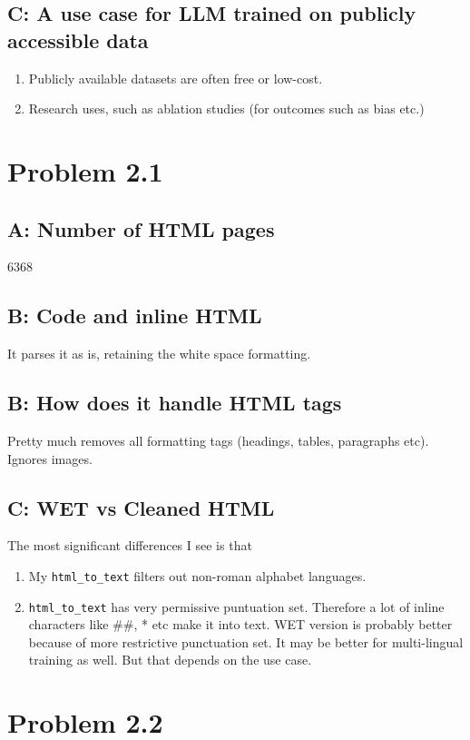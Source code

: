 \documentclass[11pt]{article}
\begin{document}
\subsection{C: A use case for LLM trained on publicly accessible data}
\label{sec:org265351b}
\begin{enumerate}
\item Publicly available datasets are often free or low-cost.
\item Research uses, such as ablation studies (for outcomes such as bias etc.)
\end{enumerate}
\section{Problem 2.1}
\label{sec:org1d44219}
\subsection{A: Number of HTML pages}
\label{sec:orgae95108}
6368
\subsection{B: Code and inline HTML}
\label{sec:org33985d5}
It parses it as is, retaining the white space formatting.
\subsection{B: How does it handle HTML tags}
\label{sec:orgdfa65bc}
Pretty much removes all formatting tags (headings, tables, paragraphs etc). Ignores images. 
\subsection{C: WET vs Cleaned HTML}
\label{sec:orgc227387}
The most significant differences I see is that
\begin{enumerate}
\item My \texttt{html\_to\_text} filters out non-roman alphabet languages.
\item \texttt{html\_to\_text} has very permissive puntuation set. Therefore a lot of inline characters like \#\#, * etc make it into text.
WET version is probably better because of more restrictive punctuation set. It may be better for multi-lingual training as well. But that depends on the use case.
\end{enumerate}
\section{Problem 2.2}
\label{sec:orgce39251}
\end{document}
